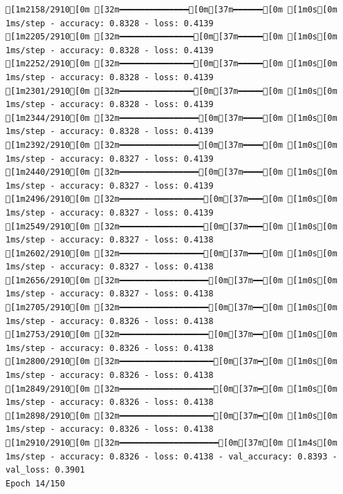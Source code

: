 \documentclass[
  letterpaper,
  DIV=11,
  numbers=noendperiod]{scrartcl}
\begin{document}
\begin{verbatim}
[1m2158/2910[0m [32m━━━━━━━━━━━━━━[0m[37m━━━━━━[0m [1m0s[0m 1ms/step - accuracy: 0.8328 - loss: 0.4139
[1m2205/2910[0m [32m━━━━━━━━━━━━━━━[0m[37m━━━━━[0m [1m0s[0m 1ms/step - accuracy: 0.8328 - loss: 0.4139
[1m2252/2910[0m [32m━━━━━━━━━━━━━━━[0m[37m━━━━━[0m [1m0s[0m 1ms/step - accuracy: 0.8328 - loss: 0.4139
[1m2301/2910[0m [32m━━━━━━━━━━━━━━━[0m[37m━━━━━[0m [1m0s[0m 1ms/step - accuracy: 0.8328 - loss: 0.4139
[1m2344/2910[0m [32m━━━━━━━━━━━━━━━━[0m[37m━━━━[0m [1m0s[0m 1ms/step - accuracy: 0.8328 - loss: 0.4139
[1m2392/2910[0m [32m━━━━━━━━━━━━━━━━[0m[37m━━━━[0m [1m0s[0m 1ms/step - accuracy: 0.8327 - loss: 0.4139
[1m2440/2910[0m [32m━━━━━━━━━━━━━━━━[0m[37m━━━━[0m [1m0s[0m 1ms/step - accuracy: 0.8327 - loss: 0.4139
[1m2496/2910[0m [32m━━━━━━━━━━━━━━━━━[0m[37m━━━[0m [1m0s[0m 1ms/step - accuracy: 0.8327 - loss: 0.4139
[1m2549/2910[0m [32m━━━━━━━━━━━━━━━━━[0m[37m━━━[0m [1m0s[0m 1ms/step - accuracy: 0.8327 - loss: 0.4138
[1m2602/2910[0m [32m━━━━━━━━━━━━━━━━━[0m[37m━━━[0m [1m0s[0m 1ms/step - accuracy: 0.8327 - loss: 0.4138
[1m2656/2910[0m [32m━━━━━━━━━━━━━━━━━━[0m[37m━━[0m [1m0s[0m 1ms/step - accuracy: 0.8327 - loss: 0.4138
[1m2705/2910[0m [32m━━━━━━━━━━━━━━━━━━[0m[37m━━[0m [1m0s[0m 1ms/step - accuracy: 0.8326 - loss: 0.4138
[1m2753/2910[0m [32m━━━━━━━━━━━━━━━━━━[0m[37m━━[0m [1m0s[0m 1ms/step - accuracy: 0.8326 - loss: 0.4138
[1m2800/2910[0m [32m━━━━━━━━━━━━━━━━━━━[0m[37m━[0m [1m0s[0m 1ms/step - accuracy: 0.8326 - loss: 0.4138
[1m2849/2910[0m [32m━━━━━━━━━━━━━━━━━━━[0m[37m━[0m [1m0s[0m 1ms/step - accuracy: 0.8326 - loss: 0.4138
[1m2898/2910[0m [32m━━━━━━━━━━━━━━━━━━━[0m[37m━[0m [1m0s[0m 1ms/step - accuracy: 0.8326 - loss: 0.4138
[1m2910/2910[0m [32m━━━━━━━━━━━━━━━━━━━━[0m[37m[0m [1m4s[0m 1ms/step - accuracy: 0.8326 - loss: 0.4138 - val_accuracy: 0.8393 - val_loss: 0.3901
Epoch 14/150


\end{verbatim}
\end{document}

